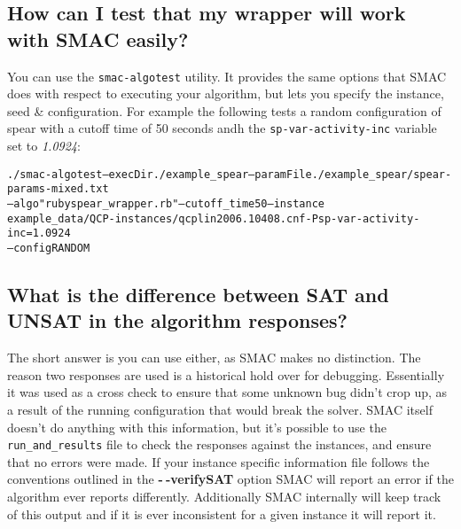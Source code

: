\documentclass[11pt,letterpaper,oneside]{article}
\begin{document}
\subsection{How can I test that my wrapper will work with SMAC easily?}
\label{sec:algotest}

You can use the \texttt{smac-algotest} utility. It provides the same options that SMAC does with respect to executing your algorithm, but lets you specify the instance, seed \& configuration. For example the following tests a random configuration of spear with a cutoff time of 50 seconds andh the \texttt{sp-var-activity-inc} variable set to \emph{1.0924}:

{\footnotesize
\begin{alltt}
./smac-algotest --execDir ./example_spear --paramFile ./example_spear/spear-params-mixed.txt
 --algo "ruby spear_wrapper.rb"  --cutoff_time 50  --instance
  example_data/QCP-instances/qcplin2006.10408.cnf -Psp-var-activity-inc=1.0924
--config RANDOM
\end{alltt}}


\subsection{What is the difference between SAT and UNSAT in the algorithm responses?}

The short answer is you can use either, as SMAC makes no distinction. The reason two responses are used is a historical hold over for debugging. Essentially it was used as a cross check to ensure that some unknown bug didn't crop up, as a result of the running configuration that would break the solver. SMAC itself doesn't do anything with this information, but it's possible to use the \texttt{run\_and\_results} file to check the responses against the instances, and ensure that no errors were made. If your instance specific information file follows the conventions outlined in the \textbf{-$~\!$-verifySAT} option SMAC will report an error if the algorithm ever reports differently. Additionally SMAC internally will keep track of this output and if it is ever inconsistent for a given instance it will report it.


\end{document}
